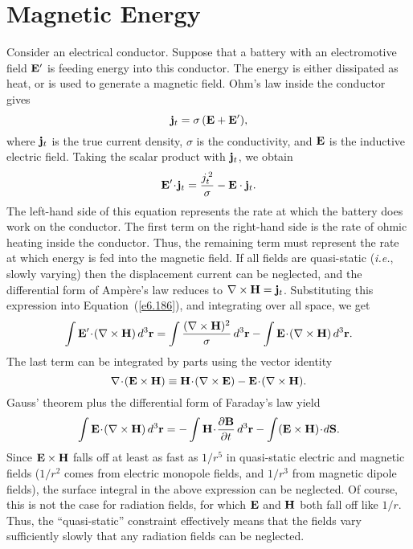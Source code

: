\section{Magnetic Energy}
Consider an electrical conductor. Suppose that a battery with an
electromotive field ${\bf E}'$ is feeding energy into this conductor.
The energy is either dissipated as heat, or is used to generate a
magnetic field. Ohm's law inside the conductor gives
\begin{equation}
{\bf j}_t = \sigma\, ({\bf E} + {\bf E}'),
\end{equation}
where ${\bf j}_t$ is the true current density, $\sigma$ is the
conductivity, and ${\bf E}$ is the inductive electric field. Taking
the scalar product with ${\bf j}_t$, we obtain
\begin{equation}\label{e6.186}
{\bf E}'\!\cdot\!{\bf j}_t =  \frac{j_t^{\,2}}{\sigma}
 -{\bf E}\cdot{\bf j}_t.
\end{equation}
The left-hand side of this equation represents the rate at which the
battery does work on the conductor. The first term on the right-hand
side is the rate of ohmic heating inside the conductor. Thus,  the remaining  term must represent the rate at which energy is fed into
the magnetic field. If all fields are quasi-static
({\em i.e.}, slowly varying) then the displacement current can be neglected,
and the differential form of Amp\`{e}re's law reduces to $\nabla\times{\bf H}
= {\bf j}_t$. Substituting this expression into Equation~(\ref{e6.186}),
and integrating over all space, we get
\begin{equation}
\int {\bf E}'\!\cdot\!(\nabla\times{\bf H})\,d^3{\bf r}
= \int\frac{(\nabla\times{\bf H})^2}{\sigma}
\,d^3{\bf r} - \int {\bf E}\!\cdot\!(\nabla\times{\bf H})\,
d^3{\bf r}.
\end{equation}
The last term can be integrated by parts using the vector identity
\begin{equation}
\nabla\!\cdot\!({\bf E}\times{\bf H}) \equiv {\bf H}\!\cdot\!(\nabla\times
{\bf E}) -  {\bf E}\!\cdot\!(\nabla\times{\bf H}).
\end{equation}
Gauss' theorem plus the differential form of Faraday's law yield
\begin{equation}
\int{\bf E}\!\cdot\!(\nabla\times{\bf H})\,d^3{\bf r} 
= -\int {\bf H}\!\cdot\!\frac{\partial{\bf B}}{\partial t}\,d^3{\bf r}
- \int({\bf E}\times{\bf H})\!\cdot\!d{\bf S}.
\end{equation}
Since ${\bf E}\times{\bf H}$ falls off at least  as fast as $1/r^5$ in
quasi-static electric and magnetic fields ($1/r^2$ comes from electric
monopole fields, and $1/r^3$ from magnetic dipole fields), the surface
integral in the above expression can be neglected. Of course, this is
not the case for radiation fields, for which ${\bf E}$ and ${\bf H}$
both fall off like $1/r$. Thus, the  ``quasi-static'' constraint effectively
means that the fields vary sufficiently slowly that any radiation fields
can be neglected. 

